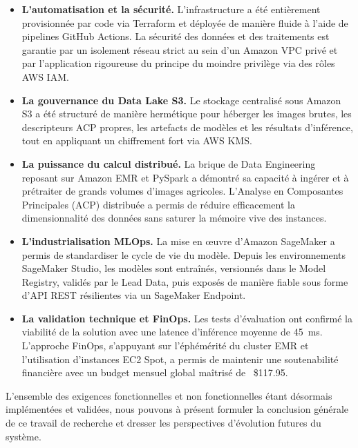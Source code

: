 \begin{itemize}
    \item[$\bullet$] \textbf{L'automatisation et la sécurité.} L'infrastructure a été entièrement provisionnée par code via Terraform et déployée de manière fluide à l'aide de pipelines GitHub Actions. La sécurité des données et des traitements est garantie par un isolement réseau strict au sein d'un Amazon VPC privé et par l'application rigoureuse du principe du moindre privilège via des rôles AWS IAM.
    \item[$\bullet$] \textbf{La gouvernance du Data Lake S3.} Le stockage centralisé sous Amazon S3 a été structuré de manière hermétique pour héberger les images brutes, les descripteurs ACP propres, les artefacts de modèles et les résultats d'inférence, tout en appliquant un chiffrement fort via AWS KMS.
    \item[$\bullet$] \textbf{La puissance du calcul distribué.} La brique de Data Engineering reposant sur Amazon EMR et PySpark a démontré sa capacité à ingérer et à prétraiter de grands volumes d'images agricoles. L'Analyse en Composantes Principales (ACP) distribuée a permis de réduire efficacement la dimensionnalité des données sans saturer la mémoire vive des instances.
    \item[$\bullet$] \textbf{L'industrialisation MLOps.} La mise en œuvre d'Amazon SageMaker a permis de standardiser le cycle de vie du modèle. Depuis les environnements SageMaker Studio, les modèles sont entraînés, versionnés dans le Model Registry, validés par le Lead Data, puis exposés de manière fiable sous forme d'API REST résilientes via un SageMaker Endpoint.
    \item[$\bullet$] \textbf{La validation technique et FinOps.} Les tests d'évaluation ont confirmé la viabilité de la solution avec une latence d'inférence moyenne de 45~ms. L'approche FinOps, s'appuyant sur l'éphémérité du cluster EMR et l'utilisation d'instances EC2 Spot, a permis de maintenir une soutenabilité financière avec un budget mensuel global maîtrisé de ~\$117.95.
\end{itemize}

L'ensemble des exigences fonctionnelles et non fonctionnelles étant désormais implémentées et validées, nous pouvons à présent formuler la conclusion générale de ce travail de recherche et dresser les perspectives d'évolution futures du système.